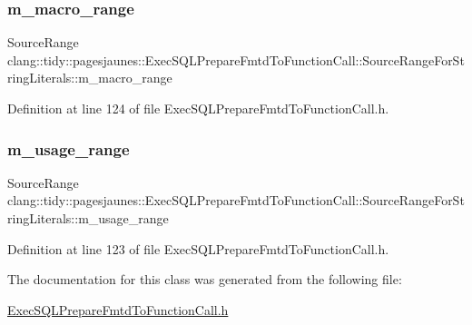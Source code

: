 \subsubsection{\texorpdfstring{m\+\_\+macro\+\_\+range}{m\_macro\_range}}
{\footnotesize\ttfamily Source\+Range clang\+::tidy\+::pagesjaunes\+::\+Exec\+S\+Q\+L\+Prepare\+Fmtd\+To\+Function\+Call\+::\+Source\+Range\+For\+String\+Literals\+::m\+\_\+macro\+\_\+range}



Definition at line 124 of file Exec\+S\+Q\+L\+Prepare\+Fmtd\+To\+Function\+Call.\+h.

\mbox{\label{classclang_1_1tidy_1_1pagesjaunes_1_1_exec_s_q_l_prepare_fmtd_to_function_call_1_1_source_range_for_string_literals_ad05857763dfad877aa064d3c9431a28d}} 
\subsubsection{\texorpdfstring{m\+\_\+usage\+\_\+range}{m\_usage\_range}}
{\footnotesize\ttfamily Source\+Range clang\+::tidy\+::pagesjaunes\+::\+Exec\+S\+Q\+L\+Prepare\+Fmtd\+To\+Function\+Call\+::\+Source\+Range\+For\+String\+Literals\+::m\+\_\+usage\+\_\+range}



Definition at line 123 of file Exec\+S\+Q\+L\+Prepare\+Fmtd\+To\+Function\+Call.\+h.



The documentation for this class was generated from the following file\+:\begin{DoxyCompactItemize}
\item 
\hyperlink{_exec_s_q_l_prepare_fmtd_to_function_call_8h}{Exec\+S\+Q\+L\+Prepare\+Fmtd\+To\+Function\+Call.\+h}\end{DoxyCompactItemize}
